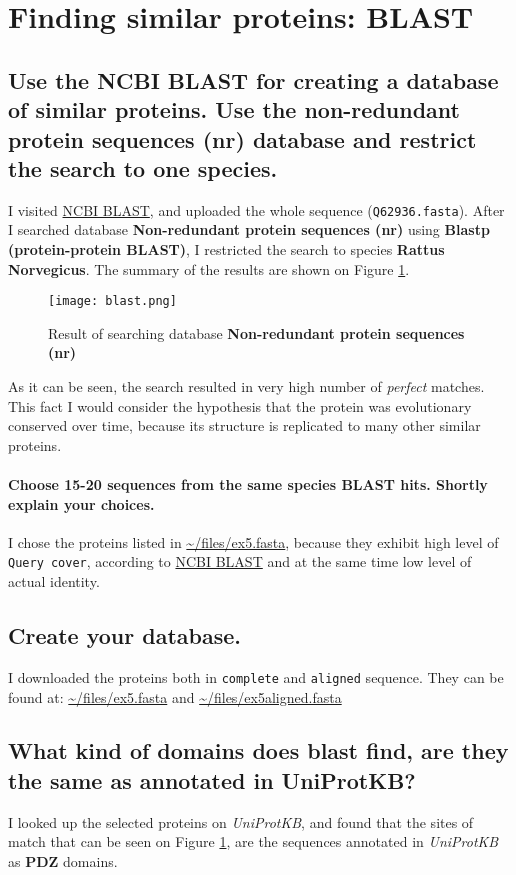 \section{Finding similar proteins: BLAST}
\subsection{Use the NCBI BLAST for creating a database of similar proteins. Use the non-redundant protein
sequences (nr) database and restrict the search to one species.}

I visited \href{https://blast.ncbi.nlm.nih.gov/Blast.cgi?PAGE=Proteins&PROGRAM=blastp&BLAST_PROGRAMS=blastp&PAGE_TYPE=BlastSearch&BLAST_SPEC=blast2seq&DATABASE=n/a&QUERY=&SUBJECTS=}{NCBI BLAST}, and uploaded the whole sequence (\texttt{Q62936.fasta}). After I searched database \textbf{Non-redundant protein sequences (nr)} using \textbf{Blastp (protein-protein BLAST)}, I restricted the search to species \textbf{Rattus Norvegicus}. The summary of the results are shown on Figure \ref{blastsum}.

\begin{figure}
\centering
\texttt{[image: blast.png]}
\caption{Result of searching database \textbf{Non-redundant protein sequences (nr)}}
\label{blastsum}
\end{figure}

As it can be seen, the search resulted in very high number of \emph{perfect} matches. This fact I would consider the hypothesis that the protein was evolutionary conserved over time, because its structure is replicated to many other similar proteins.
\paragraph{Choose 15-20 sequences from the same species BLAST hits. Shortly explain your choices.}
I chose the proteins listed in \url{~/files/ex5.fasta}, because they exhibit high level of \texttt{Query cover}, according to \href{https://blast.ncbi.nlm.nih.gov/Blast.cgi}{NCBI BLAST} and at the same time low level of actual identity.

\subsection{Create your database.}
I downloaded the proteins both in \texttt{complete} and \texttt{aligned} sequence. They can be found at: \url{~/files/ex5.fasta} and \url{~/files/ex5aligned.fasta}

\subsection{What kind of domains does blast find, are they the same as annotated in UniProtKB?}
I looked up the selected proteins on \emph{UniProtKB}, and found that the sites of match that can be seen on Figure \ref{blastsum}, are the sequences annotated in \emph{UniProtKB} as \textbf{PDZ} domains.